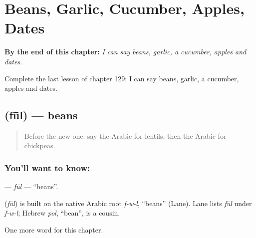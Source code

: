
\chapter{Beans, Garlic, Cucumber, Apples, Dates}
\label{ch:ar-beans-garlic-cucumber-apples-dates}

\begin{chapteropening}
\textbf{By the end of this chapter:} \emph{I can say beans, garlic, a cucumber, apples and dates.}

Complete the last lesson of chapter 129: I can say beans, garlic, a cucumber, apples and dates.
\end{chapteropening}

\section[\texorpdfstring{\ar{فول} (fūl)}{فول (fūl)}]{ (fūl) — beans}

\label{lesson:AR-C129-ful}



\begin{quote}
Before the new one: say the Arabic for lentils, then the Arabic for chickpeas.
\end{quote}

\subsection*{You'll want to know: }
\textbf{} — \emph{fūl} — \textquotedblleft{}beans\textquotedblright{}.

\begin{cousinweb}
\textbf{} (\emph{fūl}) is built on the native Arabic root \emph{f-w-l}, \textquotedblleft{}beans\textquotedblright{} (Lane). Lane lists \emph{fūl} under \emph{f-w-l}; Hebrew \emph{pol}, \textquotedblleft{}bean\textquotedblright{}, is a cousin.
\end{cousinweb}

\begin{grammarlens}[title={What you've built}]
One more word for this chapter.
\end{grammarlens}

